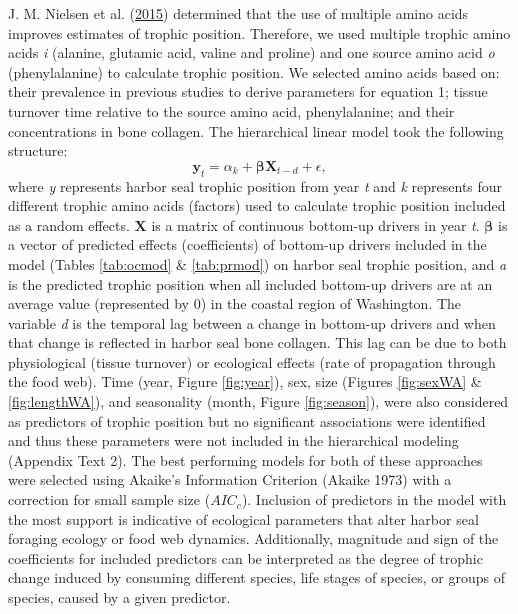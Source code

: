 \documentclass [11pt, proquest] {uwthesis}[2015/03/03]
\begin{document}
J. M. Nielsen et al. (\protect\hyperlink{ref-Nielsen2015}{2015})
determined that the use of multiple amino acids improves estimates of
trophic position. Therefore, we used multiple trophic amino acids
\emph{i} (alanine, glutamic acid, valine and proline) and one source
amino acid \emph{o} (phenylalanine) to calculate trophic position. We
selected amino acids based on: their prevalence in previous studies to
derive parameters for equation 1; tissue turnover time relative to the
source amino acid, phenylalanine; and their concentrations in bone
collagen. The hierarchical linear model took the following structure:
\begin{equation} 
\boldsymbol{y}_t = \alpha_k + \boldsymbol{\beta} \boldsymbol{X}_{t-d} +\epsilon, 
  \label{eq:hier3}
\end{equation}
where \emph{y} represents harbor seal trophic position from year
\emph{t} and \emph{k} represents four different trophic amino acids
(factors) used to calculate trophic position included as a random
effects. \(\boldsymbol{X}\) is a matrix of continuous bottom-up drivers
in year \emph{t}. \(\boldsymbol{\beta}\) is a vector of predicted
effects (coefficients) of bottom-up drivers included in the model
(Tables \ref{tab:ocmod} \& \ref{tab:prmod}) on harbor seal trophic
position, and \emph{a} is the predicted trophic position when all
included bottom-up drivers are at an average value (represented by 0) in
the coastal region of Washington. The variable \emph{d} is the temporal
lag between a change in bottom-up drivers and when that change is
reflected in harbor seal bone collagen. This lag can be due to both
physiological (tissue turnover) or ecological effects (rate of
propagation through the food web). Time (year, Figure \ref{fig:year}),
sex, size (Figures \ref{fig:sexWA} \& \ref{fig:lengthWA}), and
seasonality (month, Figure \ref{fig:season}), were also considered as
predictors of trophic position but no significant associations were
identified and thus these parameters were not included in the
hierarchical modeling (Appendix Text 2). The best performing models for
both of these approaches were selected using Akaike's Information
Criterion (Akaike 1973) with a correction for small sample size
(\(AIC_{c}\)). Inclusion of predictors in the model with the most
support is indicative of ecological parameters that alter harbor seal
foraging ecology or food web dynamics. Additionally, magnitude and sign
of the coefficients for included predictors can be interpreted as the
degree of trophic change induced by consuming different species, life
stages of species, or groups of species, caused by a given predictor.
\end{document}
